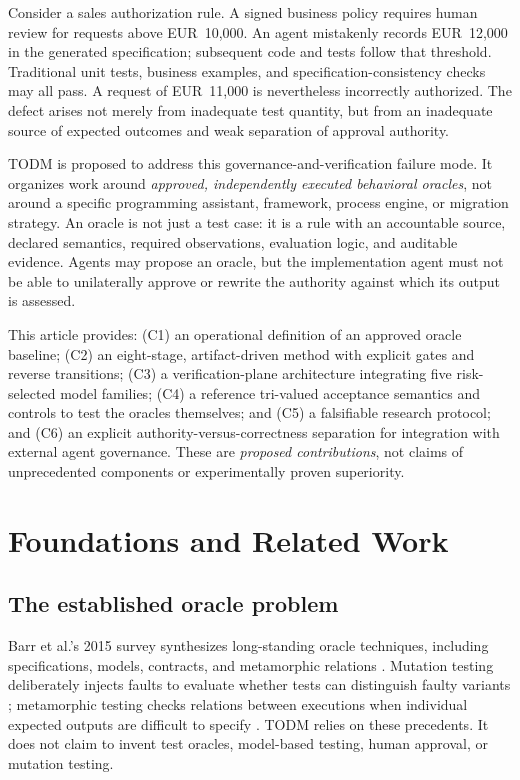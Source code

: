 \documentclass[11pt,a4paper]{article}
\newcommand{\todm}{\textsc{TODM}}
\begin{document}
Consider a sales authorization rule. A signed business policy requires human review for requests above EUR~10,000. An agent mistakenly records EUR~12,000 in the generated specification; subsequent code and tests follow that threshold. Traditional unit tests, business examples, and specification-consistency checks may all pass. A request of EUR~11,000 is nevertheless incorrectly authorized. The defect arises not merely from inadequate test quantity, but from an inadequate source of expected outcomes and weak separation of approval authority.

\todm{} is proposed to address this governance-and-verification failure mode. It organizes work around \emph{approved, independently executed behavioral oracles}, not around a specific programming assistant, framework, process engine, or migration strategy. An oracle is not just a test case: it is a rule with an accountable source, declared semantics, required observations, evaluation logic, and auditable evidence. Agents may propose an oracle, but the implementation agent must not be able to unilaterally approve or rewrite the authority against which its output is assessed.

This article provides: (C1) an operational definition of an approved oracle baseline; (C2) an eight-stage, artifact-driven method with explicit gates and reverse transitions; (C3) a verification-plane architecture integrating five risk-selected model families; (C4) a reference tri-valued acceptance semantics and controls to test the oracles themselves; and (C5) a falsifiable research protocol; and (C6) an explicit authority-versus-correctness separation for integration with external agent governance. These are \emph{proposed contributions}, not claims of unprecedented components or experimentally proven superiority.

\section{Foundations and Related Work}
\subsection{The established oracle problem}
Barr et al.'s 2015 survey synthesizes long-standing oracle techniques, including specifications, models, contracts, and metamorphic relations \cite{barr2015oracle}. Mutation testing deliberately injects faults to evaluate whether tests can distinguish faulty variants \cite{jia2011mutation}; metamorphic testing checks relations between executions when individual expected outputs are difficult to specify \cite{segura2016metamorphic}. \todm{} relies on these precedents. It does not claim to invent test oracles, model-based testing, human approval, or mutation testing.
\end{document}
